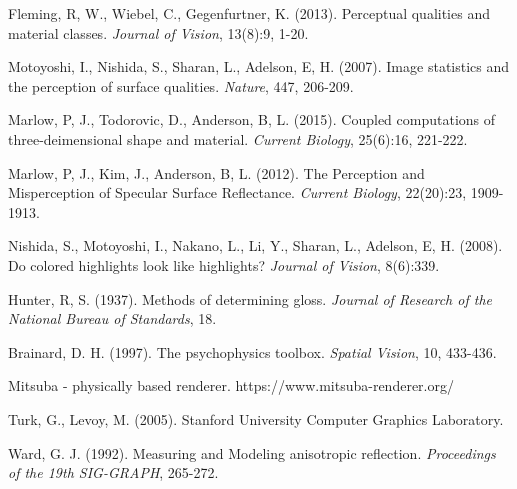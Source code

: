 \begin{thebibliography}{99}%

    Fleming, R, W., Wiebel, C., Gegenfurtner, K. (2013).
    Perceptual qualities and material classes.
    {\it Journal of Vision}, 13(8):9, 1-20.

    Motoyoshi, I., Nishida, S., Sharan, L., Adelson, E, H. (2007).
    Image statistics and the perception of surface qualities.
    {\it Nature}, 447, 206-209.

    Marlow, P, J., Todorovic, D., Anderson, B, L. (2015).
    Coupled computations of three-deimensional shape and material.
    {\it Current Biology}, 25(6):16, 221-222.

    Marlow, P, J., Kim, J., Anderson, B, L. (2012).
    The Perception and Misperception of Specular Surface Reflectance.
    {\it Current Biology}, 22(20):23, 1909-1913.


    Nishida, S., Motoyoshi, I., Nakano, L., Li, Y., Sharan, L., Adelson, E, H. (2008).
    Do colored highlights look like highlights?
    {\it Journal of Vision}, 8(6):339.

    Hunter, R, S. (1937).
    Methods of determining gloss.
    {\it Journal of Research of the National Bureau of Standards}, 18.

    Brainard, D. H. (1997).
    The psychophysics toolbox.
    {\it Spatial Vision}, 10, 433-436.

    Mitsuba - physically based renderer. https://www.mitsuba-renderer.org/

    Turk, G., Levoy, M. (2005).
    Stanford University Computer Graphics Laboratory.

    Ward, G. J. (1992).
    Measuring and Modeling anisotropic reflection.
    {\it Proceedings of the 19th SIG-GRAPH}, 265-272.


\end{thebibliography}
